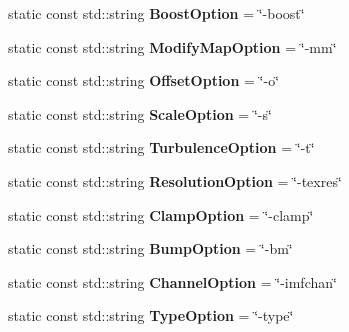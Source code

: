 \begin{DoxyCompactItemize}
\item 
\hypertarget{class_assimp_a36d0d96fc068e1ae24a43b367d32e07a}{static const std\+::string {\bfseries Boost\+Option} = \char`\"{}-\/boost\char`\"{}}\label{class_assimp_a36d0d96fc068e1ae24a43b367d32e07a}

\item 
\hypertarget{class_assimp_a2d31b5fae342ee574ca4202615ab38ed}{static const std\+::string {\bfseries Modify\+Map\+Option} = \char`\"{}-\/mm\char`\"{}}\label{class_assimp_a2d31b5fae342ee574ca4202615ab38ed}

\item 
\hypertarget{class_assimp_acbf3ea19b484d034630f28d7a07f1f12}{static const std\+::string {\bfseries Offset\+Option} = \char`\"{}-\/o\char`\"{}}\label{class_assimp_acbf3ea19b484d034630f28d7a07f1f12}

\item 
\hypertarget{class_assimp_a0b638a002618d9611e04419b80aadb02}{static const std\+::string {\bfseries Scale\+Option} = \char`\"{}-\/s\char`\"{}}\label{class_assimp_a0b638a002618d9611e04419b80aadb02}

\item 
\hypertarget{class_assimp_a161c7f65f1e8e18a1f515e5b8b8f601e}{static const std\+::string {\bfseries Turbulence\+Option} = \char`\"{}-\/t\char`\"{}}\label{class_assimp_a161c7f65f1e8e18a1f515e5b8b8f601e}

\item 
\hypertarget{class_assimp_a8bb8fb83adb9eaa6336deac4715ab81d}{static const std\+::string {\bfseries Resolution\+Option} = \char`\"{}-\/texres\char`\"{}}\label{class_assimp_a8bb8fb83adb9eaa6336deac4715ab81d}

\item 
\hypertarget{class_assimp_ad51adba3ff697c01fd19eed1aff989a8}{static const std\+::string {\bfseries Clamp\+Option} = \char`\"{}-\/clamp\char`\"{}}\label{class_assimp_ad51adba3ff697c01fd19eed1aff989a8}

\item 
\hypertarget{class_assimp_a6e78a1e597322c40c46c956821a1f65b}{static const std\+::string {\bfseries Bump\+Option} = \char`\"{}-\/bm\char`\"{}}\label{class_assimp_a6e78a1e597322c40c46c956821a1f65b}

\item 
\hypertarget{class_assimp_a8efc04e553a467cbf533bb1ce2d9151d}{static const std\+::string {\bfseries Channel\+Option} = \char`\"{}-\/imfchan\char`\"{}}\label{class_assimp_a8efc04e553a467cbf533bb1ce2d9151d}

\item 
\hypertarget{class_assimp_aeb4cf892dfdd5eeb674b3d0a63c935a3}{static const std\+::string {\bfseries Type\+Option} = \char`\"{}-\/type\char`\"{}}\label{class_assimp_aeb4cf892dfdd5eeb674b3d0a63c935a3}


\end{DoxyCompactItemize}
